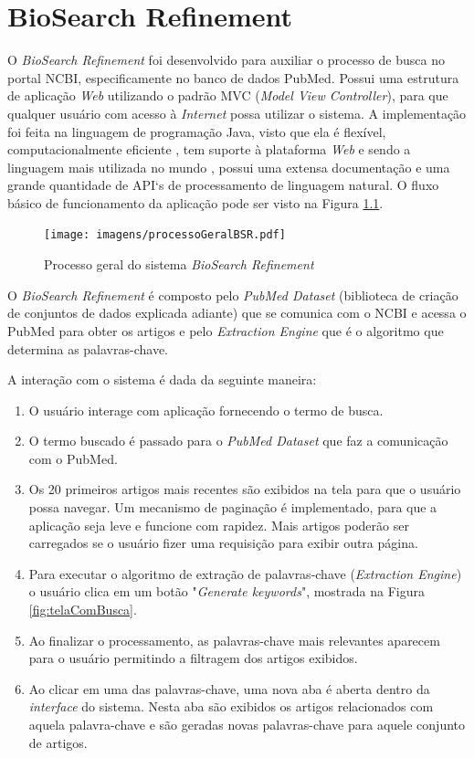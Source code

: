 \chapter{BioSearch Refinement}

O \emph{BioSearch Refinement} foi desenvolvido para auxiliar o processo de busca no portal NCBI, especificamente no banco de dados PubMed. Possui uma estrutura de aplicação \emph{Web} utilizando o padrão MVC (\emph{Model View Controller}), para que qualquer usuário com acesso à \emph{Internet} possa utilizar o sistema. A implementação foi feita na linguagem de programação Java, visto que ela é flexível, computacionalmente eficiente \cite{Oracle2010}, tem suporte à plataforma \emph{Web} e sendo a linguagem mais utilizada no mundo \cite{TIOBE2011}, possui uma extensa documentação e uma grande quantidade de API`s de processamento de linguagem natural. O fluxo básico de funcionamento da aplicação pode ser visto na Figura \ref{fig:1}. 
\begin{figure}[h!]
    \center
    \texttt{[image: imagens/processoGeralBSR.pdf]}
    \caption{Processo geral do sistema \emph{BioSearch Refinement} \label{fig:1}} 
\end{figure}

O \emph{BioSearch Refinement} é composto pelo \emph{PubMed Dataset} (biblioteca de criação de conjuntos de dados explicada adiante) que se comunica com o NCBI e acessa o PubMed para obter os artigos e pelo \emph{Extraction Engine} que é o algoritmo que determina as palavras-chave.

A interação com o sistema é dada da seguinte maneira:

\begin{enumerate}
    \item O usuário interage com aplicação fornecendo o termo de busca.
    \item O termo buscado é passado para o \emph{PubMed Dataset}  que faz a comunicação com o PubMed.
    \item Os 20 primeiros artigos mais recentes são exibidos na tela para que o usuário possa navegar. Um mecanismo de paginação é implementado, para que a aplicação seja leve e funcione com rapidez. Mais artigos poderão ser carregados se o usuário fizer uma requisição para exibir outra página.
    \item Para executar o algoritmo de extração de palavras-chave (\emph{Extraction Engine}) o usuário clica em um botão "\emph{Generate keywords}", mostrada na Figura \ref{fig:telaComBusca}.
    \item Ao finalizar o processamento, as palavras-chave mais relevantes aparecem para o usuário permitindo a filtragem dos artigos exibidos.
    \item Ao clicar em uma das palavras-chave, uma nova aba é aberta dentro da \emph{interface} do sistema. Nesta aba são exibidos os artigos relacionados com aquela palavra-chave e são geradas novas palavras-chave para aquele conjunto de artigos.
\end{enumerate}

